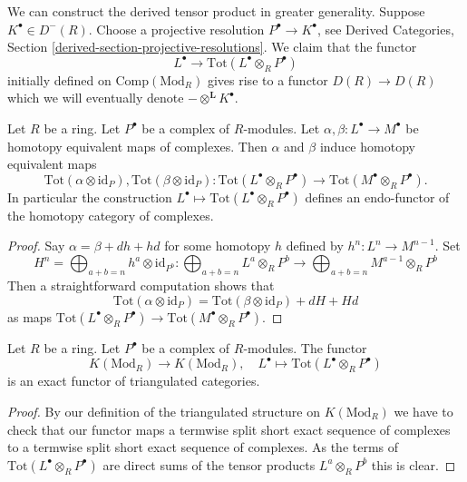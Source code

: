 \medskip\noindent
We can construct the derived tensor product in greater generality.
Suppose $K^\bullet \in D^{-}(R)$.
Choose a projective resolution $P^\bullet \to K^\bullet$, see
Derived Categories, Section \ref{derived-section-projective-resolutions}.
We claim that the functor
$$
L^\bullet \longrightarrow \text{Tot}(L^\bullet \otimes_R P^\bullet)
$$
initially defined on $\text{Comp}(\text{Mod}_R)$ gives rise to a
functor $D(R) \to D(R)$ which we will eventually denote
$ - \otimes^{\mathbf{L}} K^\bullet$.

\begin{lemma}
\label{lemma-derived-tor-homotopy}
Let $R$ be a ring.
Let $P^\bullet$ be a complex of $R$-modules.
Let $\alpha, \beta : L^\bullet \to M^\bullet$ be homotopy equivalent
maps of complexes. Then $\alpha$ and $\beta$ induce homotopy equivalent
maps
$$
\text{Tot}(\alpha \otimes \text{id}_P),
\text{Tot}(\beta \otimes \text{id}_P) :
\text{Tot}(L^\bullet \otimes_R P^\bullet)
\longrightarrow
\text{Tot}(M^\bullet \otimes_R P^\bullet).
$$
In particular the construction
$L^\bullet \mapsto \text{Tot}(L^\bullet \otimes_R P^\bullet)$
defines an endo-functor of the homotopy category of complexes.
\end{lemma}

\begin{proof}
Say $\alpha = \beta + dh + hd$ for some homotopy $h$ defined by
$h^n : L^n \to M^{n - 1}$. Set
$$
H^n = \bigoplus\nolimits_{a + b = n} h^a \otimes \text{id}_{P^b} :
\bigoplus\nolimits_{a + b = n} L^a \otimes_R P^b
\longrightarrow
\bigoplus\nolimits_{a + b = n} M^{a - 1} \otimes_R P^b
$$
Then a straightforward computation shows that
$$
\text{Tot}(\alpha \otimes \text{id}_P) =
\text{Tot}(\beta \otimes \text{id}_P) + dH + Hd
$$
as maps $\text{Tot}(L^\bullet \otimes_R P^\bullet) \to
\text{Tot}(M^\bullet \otimes_R P^\bullet)$.
\end{proof}

\begin{lemma}
\label{lemma-derived-tor-exact}
Let $R$ be a ring.
Let $P^\bullet$ be a complex of $R$-modules.
The functor
$$
K(\text{Mod}_R) \longrightarrow K(\text{Mod}_R),\quad
L^\bullet \longmapsto \text{Tot}(L^\bullet \otimes_R P^\bullet)
$$
is an exact functor of triangulated categories.
\end{lemma}

\begin{proof}
By our definition of the triangulated structure on
$K(\text{Mod}_R)$ we have to check that our functor maps
a termwise split short exact sequence of complexes to a termwise
split short exact sequence of complexes. As the terms of
$\text{Tot}(L^\bullet \otimes_R P^\bullet)$ are direct sums
of the tensor products $L^a \otimes_R P^b$ this is clear.
\end{proof}

